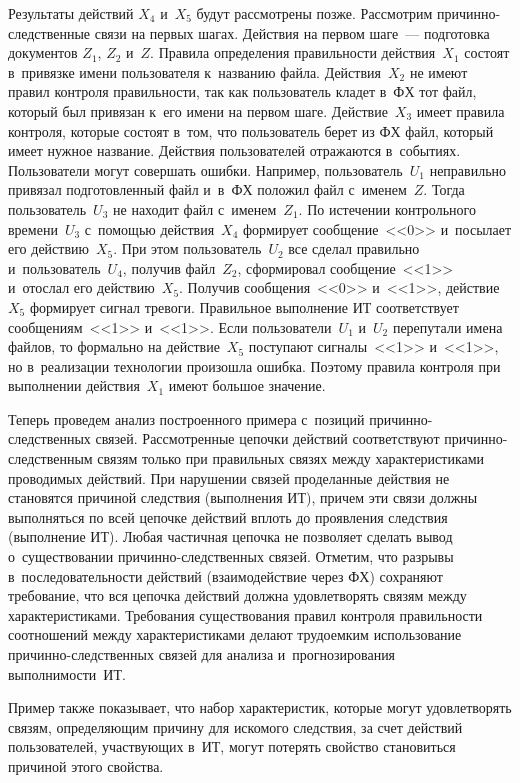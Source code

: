 \begin{multicols}{2}
  Результаты действий $X_4$ и~$X_5$ будут рассмотрены позже. Рассмотрим  
при\-чин\-но-след\-ст\-вен\-ные связи на первых шагах. Действия на первом 
шаге~--- подготовка документов $Z_1$, $Z_2$ и~$Z$. Правила определения 
правильности действия~$X_1$ состоят в~привязке имени пользователя к~названию 
файла. Действия~$X_2$ не имеют правил контроля правильности, так как 
пользователь кладет в~ФХ тот файл, который был привязан к~его имени на первом 
шаге. Действие~$X_3$ имеет правила контроля, которые состоят в~том, что 
пользователь берет из ФХ файл, который имеет нужное название. Действия 
пользователей отражаются в~событиях. Пользователи могут совершать ошибки. 
Например, пользователь~$U_1$ неправильно привязал подготовленный файл 
и~в~ФХ положил файл с~именем~$Z$. Тогда пользователь~$U_3$ не находит 
файл с~именем~$Z_1$. По истечении контрольного времени~$U_3$ с~помощью 
действия~$X_4$ формирует сообщение~<<0>> и~посылает его действию~$X_5$. 
При этом пользователь~$U_2$ все сделал правильно и~пользователь~$U_4$, 
получив файл~$Z_2$, сформировал сообщение~<<1>> и~отослал его 
действию~$X_5$. Получив сообщения~<<0>> и~<<1>>, действие~$X_5$ 
формирует сигнал тревоги. Правильное выполнение ИТ соответствует 
сообщениям~<<1>> и~<<1>>. Если пользователи~$U_1$ и~$U_2$ перепутали 
имена файлов, то формально на действие~$X_5$ поступают сигналы~<<1>> 
и~<<1>>, но в~реализации технологии произошла ошибка. Поэтому правила 
контроля при выполнении действия~$X_1$ имеют большое значение. 
  
  Теперь проведем анализ построенного примера с~позиций при\-чин\-но-след\-ст\-вен\-ных связей. 
  Рас\-смот\-рен\-ные цепочки действий соответствуют при\-чин\-но-след\-ст\-вен\-ным 
связям только при правильных связях между характеристиками 
проводимых действий. При нарушении связей проделанные действия не 
становятся причиной следствия (выполнения ИТ), причем эти связи должны 
выполняться по всей цепочке действий вплоть до проявления следствия 
(выполнение ИТ). Любая частичная цепочка не позволяет сделать вывод 
о~существовании причинно-следственных связей. Отметим, что разрывы 
в~последовательности действий (взаимодействие через ФХ) сохраняют 
требование, что вся цепочка действий должна удовлетворять связям между 
характеристиками. Требования существования правил контроля правильности 
соотношений между характеристиками делают трудоемким использование  
при\-чин\-но-след\-ст\-вен\-ных связей для анализа и~прогнозирования  
вы\-пол\-ни\-мости~ИТ.
  
  Пример также показывает, что набор характеристик, которые могут 
удовлетворять связям, определяющим причину для искомого следствия, за счет 
действий пользователей, участвующих в~ИТ, могут потерять свойство 
становиться причиной этого свойства.
  

\end{multicols}

